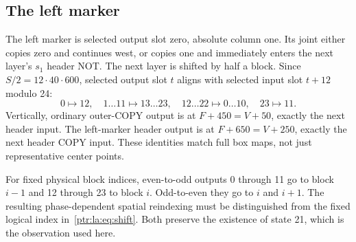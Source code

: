 \documentclass[11pt,letterpaper]{article}
\theoremstyle{definition}\newtheorem{definition}[theorem]{Definition}
\theoremstyle{remark}\newtheorem{remark}[theorem]{Remark}
\begin{document}
\subsection{The left marker}
The left marker is selected output slot zero, absolute column one. Its joint either copies zero and continues west, or copies one and immediately enters the next layer's $s_1$ header NOT. The next layer is shifted by half a block. Since $S/2=12\cdot40\cdot600$, selected output slot $t$ aligns with selected input slot $t+12$ modulo 24:
\[
0\mapsto12,\quad1\ldots11\mapsto13\ldots23,
\quad12\ldots22\mapsto0\ldots10,\quad23\mapsto11.
\]
Vertically, ordinary outer-COPY output is at $F+450=V+50$, exactly the next header input. The left-marker header output is at $F+650=V+250$, exactly the next header COPY input. These identities match full box maps, not just representative center points.

For fixed physical block indices, even-to-odd outputs 0 through 11 go to block $i-1$ and 12 through 23 to block $i$. Odd-to-even they go to $i$ and $i+1$. The resulting phase-dependent spatial reindexing must be distinguished from the fixed logical index in~\eqref{ptr:la:eq:shift}. Both preserve the existence of state 21, which is the observation used here.
\end{document}
